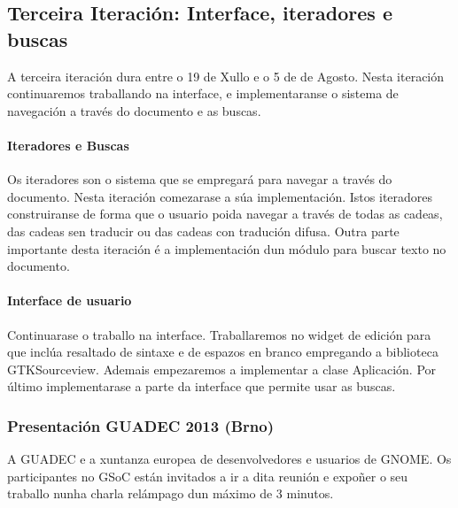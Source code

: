 \subsection{Terceira Iteración: Interface, iteradores e buscas}
A terceira iteración dura entre o 19 de Xullo e o 5 de de Agosto. Nesta iteración continuaremos traballando na interface, e implementaranse o sistema de navegación a través do documento e as buscas.

\paragraph{Iteradores e Buscas}
Os iteradores son o sistema que se empregará para navegar a través do documento. Nesta iteración comezarase a súa implementación. Istos iteradores construiranse de forma que o usuario poida navegar a través de todas as cadeas, das cadeas sen traducir ou das cadeas con tradución difusa. Outra parte importante desta iteración é a implementación dun módulo para buscar texto no documento.

\paragraph{Interface de usuario}
Continuarase o traballo na interface. Traballaremos no widget de edición para que inclúa resaltado de sintaxe e de espazos en branco empregando a biblioteca GTKSourceview. Ademais empezaremos a implementar a clase Aplicación. Por último implementarase a parte da interface que permite usar as buscas.


\subsubsection{Presentación GUADEC 2013 (Brno)}
A GUADEC e a xuntanza europea de desenvolvedores e usuarios de GNOME. Os participantes no GSoC están invitados a ir a dita reunión e expoñer o seu traballo nunha charla relámpago dun máximo de 3 minutos.

